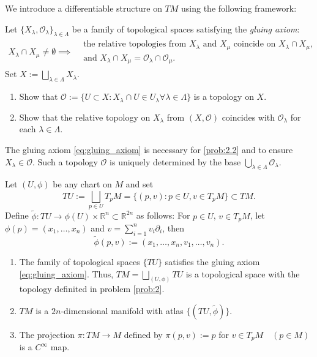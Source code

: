 We introduce a differentiable structure on $TM$ using the following framework:

\begin{problem}
Let $\{X_{\lambda}, \mathcal{O}_{\lambda}\}_{\lambda \in \Lambda}$ be a family of topological spaces satisfying the \emph{gluing axiom}:
\begin{align}
X_{\lambda} \cap X_{\mu} \neq \emptyset \implies
\begin{aligned}
&\text{the relative topologies from } X_{\lambda} \text{ and } X_{\mu} \text{ coincide on } X_{\lambda} \cap X_{\mu},\\
&\text{and } X_{\lambda} \cap X_{\mu} = \mathcal{O}_{\lambda} \cap \mathcal{O}_{\mu}.
\end{aligned}
\label{eq:gluing_axiom}
\end{align}
Set $X := \bigsqcup_{\lambda \in \Lambda} X_{\lambda}$.
\begin{enumerate}[label=(\arabic*)]
\item Show that $\mathcal{O} := \{U \subset X : X_{\lambda} \cap U \in U_{\lambda} \forall \lambda \in \Lambda\}$ is a topology
on $X$.
\item Show that the relative topology on $X_{\lambda}$ from $(X, \mathcal{O})$ coincides with $\mathcal{O}_{\lambda}$ for each $\lambda \in \Lambda$.
\label{prob:2.2}
\end{enumerate}
\label{prob:2}
\end{problem} 

\begin{remark}
The gluing axiom \ref{eq:gluing_axiom} is necessary for \ref{prob:2.2} and to ensure $X_{\lambda} \in \mathcal{O}$. Such a topology $\mathcal{O}$ is uniquely determined
by the base $\bigcup_{\lambda \in \Lambda} \mathcal{O}_{\lambda}$.
\end{remark}

Let $(U, \phi)$ be any chart on $M$ and set
\[TU := \bigsqcup_{p \in U} T_pM = \{(p,v) : p \in U, v \in T_pM\} \subset TM.\]
Define $\tilde{\phi}: TU \to \phi(U) \times \mathbb{R}^n \subset \mathbb{R}^{2n}$ as follows:
For $p \in U$, $v \in T_pM$, let $\phi(p) = (x_1, \ldots, x_n)$ and $v = \sum_{i=1}^n v_i\partial_i$, then
\[\tilde{\phi}(p,v) := (x_1, \ldots, x_n, v_1, \ldots, v_n).\]

\begin{theorem}
\begin{enumerate}[label=(\arabic*)]
\item The family of topological spaces $\{TU\}$ satisfies the gluing axiom \ref{eq:gluing_axiom}.
Thus, $TM = \bigsqcup_{(U,\phi)} TU$ is a topological space with the topology definited in problem \ref{prob:2}.
\item $TM$ is a $2n$-dimensional manifold with atlas $\{(TU, \tilde{\phi})\}$.
\item The projection $\pi:TM \to M$ defined by $\pi(p,v) := p$ for $v \in T_pM \quad (p \in M)$ is a $C^{\infty}$ map.
\end{enumerate}
\end{theorem}